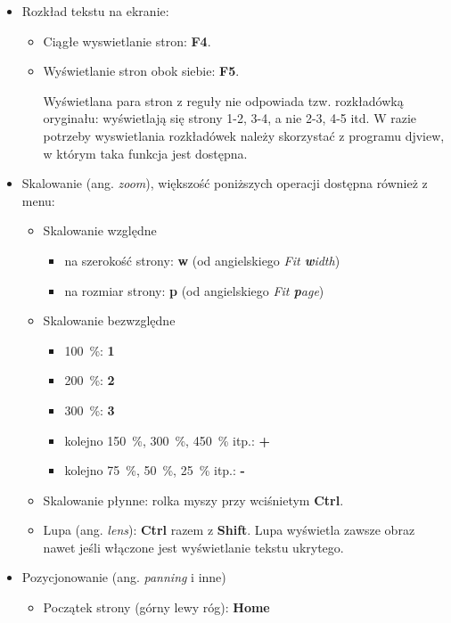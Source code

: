 \documentclass{mwart}
\def\key#1{\textbf{#1}}
\begin{document}
\begin{itemize}
  
\item Rozkład tekstu na ekranie:
  \begin{itemize}
  \item Ciągłe wyswietlanie stron: \key{F4}.
  \item Wyświetlanie stron obok siebie: \key{F5}.

    Wyświetlana para stron z reguły nie odpowiada tzw. rozkładówką
    oryginału: wyświetlają się strony 1-2, 3-4, a nie 2-3, 4-5 itd. W
    razie potrzeby wyswietlania rozkładówek należy skorzystać z
    programu \textsf{djview}, w którym taka funkcja jest dostępna.
  \end{itemize}
\item Skalowanie (ang. \textit{zoom}), większość poniższych operacji
  dostępna również z menu:
  \begin{itemize}
  \item Skalowanie względne
    \begin{itemize}
    \item na szerokość strony: \key{w} (od angielskiego \textit{Fit
\textbf{w}idth})
    \item na rozmiar strony: \key{p} (od angielskiego \textit{Fit
\textbf{p}age})
    \end{itemize}
  \item Skalowanie bezwzględne
    \begin{itemize}
    \item 100~\%: \key{1}
    \item 200~\%: \key{2}
    \item 300~\%: \key{3}
    \item kolejno 150~\%, 300~\%, 450~\% itp.: \key{+}
    \item kolejno 75~\%, 50~\%, 25~\% itp.: \key{-}
    \end{itemize}
  \item Skalowanie płynne: rolka myszy przy wciśnietym \key{Ctrl}.
  \item Lupa (ang. \textit{lens}): \key{Ctrl} razem z
    \key{Shift}. Lupa wyświetla zawsze obraz nawet jeśli włączone jest
    wyświetlanie tekstu ukrytego.
\end{itemize}
  \item Pozycjonowanie (ang. \textit{panning} i inne)
    \begin{itemize}
    \item Początek strony (górny lewy róg): \key{Home}

\end{itemize}
\end{itemize}
\end{document}
